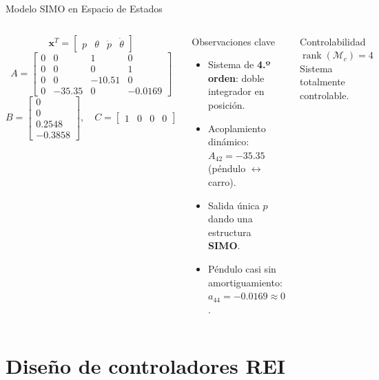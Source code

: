 \documentclass[mathserif,spanish,10pt]{beamer}
\begin{document}
\begin{frame}{Modelo SIMO en Espacio de Estados}
\begin{columns}[T]
  \vspace{-4pt}
  \[
    \mathbf{x}^T = \begin{bmatrix} p & \theta & \dot{p} & \dot{\theta} \end{bmatrix}
  \]
  \[
    A = \begin{bmatrix}
          0 & 0 & 1 & 0 \\
          0 & 0 & 0 & 1 \\
          0 & 0 & -10.51 & 0 \\
          0 & -35.35 & 0 & -0.0169
        \end{bmatrix}
  \]
  \[
    B = \begin{bmatrix} 0 \\ 0 \\ 0.2548 \\ -0.3858 \end{bmatrix}, \quad
    C = \begin{bmatrix} 1 & 0 & 0 & 0 \end{bmatrix}
  \]

  \begin{block}{Observaciones clave}
    \scriptsize
    \begin{itemize}
      \item Sistema de \textbf{4.º orden}: doble integrador en posición.
      \item Acoplamiento dinámico: $A_{42}=-35.35$ (péndulo $\leftrightarrow$ carro).
      \item Salida única $p$ dando una estructura \textbf{SIMO}.
      \item Péndulo casi sin amortiguamiento: $a_{44}=-0.0169\approx 0$.
    \end{itemize}
  \end{block}

  \begin{block}{Controlabilidad}
    \centering\small
    $\operatorname{rank}(\mathcal{M}_c) = 4$\\[2pt]
    Sistema totalmente controlable.
  \end{block}
\end{columns}
\end{frame}

\section{Diseño de controladores REI}
\end{document}
